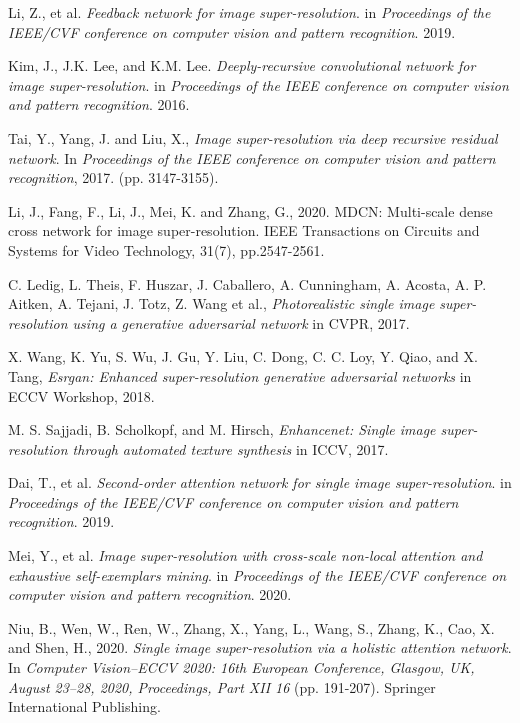 \documentclass{ieeeaccess}
\begin{document}
\begin{thebibliography}{00}
 Li, Z., et al. \textit{Feedback network for image super-resolution}. in \textit{Proceedings of the IEEE/CVF conference on computer vision and pattern recognition}. 2019.

 Kim, J., J.K. Lee, and K.M. Lee. \textit{Deeply-recursive convolutional network for image super-resolution}. in \textit{Proceedings of the IEEE conference on computer vision and pattern recognition}. 2016.

 Tai, Y., Yang, J. and Liu, X., \textit{Image super-resolution via deep recursive residual network}. In \textit{Proceedings of the IEEE conference on computer vision and pattern recognition}, 2017. (pp. 3147-3155).

 Li, J., Fang, F., Li, J., Mei, K. and Zhang, G., 2020. MDCN: Multi-scale dense cross network for image super-resolution. IEEE Transactions on Circuits and Systems for Video Technology, 31(7), pp.2547-2561.

 C. Ledig, L. Theis, F. Huszar, J. Caballero, A. Cunningham, A. Acosta, A. P. Aitken, A. Tejani, J. Totz, Z. Wang et al., \textit{Photorealistic single image super-resolution using a generative adversarial network} in CVPR, 2017.

 X. Wang, K. Yu, S. Wu, J. Gu, Y. Liu, C. Dong, C. C. Loy, Y. Qiao, and X. Tang, \textit{Esrgan: Enhanced super-resolution generative adversarial networks} in ECCV Workshop, 2018.

 M. S. Sajjadi, B. Scholkopf, and M. Hirsch, \textit{Enhancenet: Single image super-resolution through automated texture synthesis} in ICCV, 2017.

 Dai, T., et al. \textit{Second-order attention network for single image super-resolution}. in \textit{Proceedings of the IEEE/CVF conference on computer vision and pattern recognition}. 2019.

 Mei, Y., et al. \textit{Image super-resolution with cross-scale non-local attention and exhaustive self-exemplars mining}. in \textit{Proceedings of the IEEE/CVF conference on computer vision and pattern recognition}. 2020.

 Niu, B., Wen, W., Ren, W., Zhang, X., Yang, L., Wang, S., Zhang, K., Cao, X. and Shen, H., 2020. \textit{Single image super-resolution via a holistic attention network}. In \textit{Computer Vision–ECCV 2020: 16th European Conference, Glasgow, UK, August 23–28, 2020, Proceedings, Part XII 16} (pp. 191-207). Springer International Publishing.


\end{thebibliography}
\end{document}
